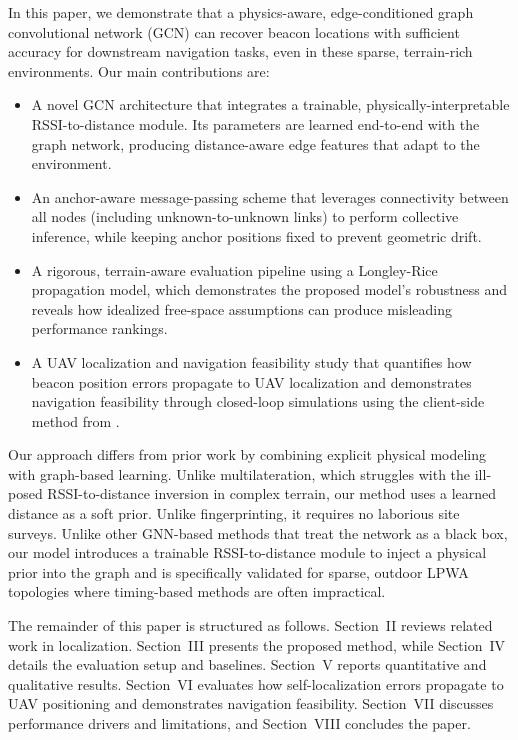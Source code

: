 \documentclass{ieeeaccess}
\begin{document}
In this paper, we demonstrate that a physics-aware, edge-conditioned graph convolutional network (GCN) can recover beacon locations with sufficient accuracy for downstream navigation tasks, even in these sparse, terrain-rich environments. Our main contributions are:
\begin{itemize}
    \item A novel GCN architecture that integrates a trainable, physically-interpretable RSSI-to-distance module. Its parameters are learned end-to-end with the graph network, producing distance-aware edge features that adapt to the environment.
    \item An anchor-aware message-passing scheme that leverages connectivity between all nodes (including unknown-to-unknown links) to perform collective inference, while keeping anchor positions fixed to prevent geometric drift.
    \item A rigorous, terrain-aware evaluation pipeline using a Longley-Rice propagation model, which demonstrates the proposed model's robustness and reveals how idealized free-space assumptions can produce misleading performance rankings.
    \item A UAV localization and navigation feasibility study that quantifies how beacon position errors propagate to UAV localization and demonstrates navigation feasibility through closed-loop simulations using the client-side method from \cite{r1}.
\end{itemize}

Our approach differs from prior work by combining explicit physical modeling with graph-based learning. Unlike multilateration, which struggles with the ill-posed RSSI-to-distance inversion in complex terrain, our method uses a learned distance as a soft prior. Unlike fingerprinting, it requires no laborious site surveys. Unlike other GNN-based methods that treat the network as a black box, our model introduces a trainable RSSI-to-distance module to inject a physical prior into the graph and is specifically validated for sparse, outdoor LPWA topologies where timing-based methods are often impractical.

The remainder of this paper is structured as follows. Section~II reviews related work in localization. Section~III presents the proposed method, while Section~IV details the evaluation setup and baselines. Section~V reports quantitative and qualitative results. Section~VI evaluates how self-localization errors propagate to UAV positioning and demonstrates navigation feasibility. Section~VII discusses performance drivers and limitations, and Section~VIII concludes the paper.
\end{document}
